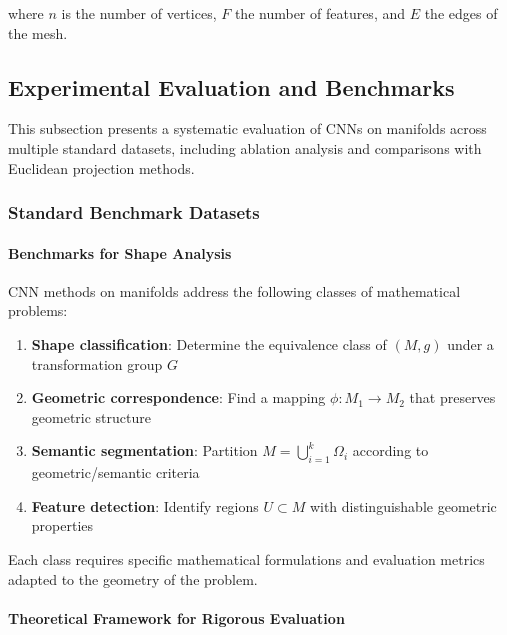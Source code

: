 where $n$ is the number of vertices, $F$ the number of features, and $E$ the edges of the mesh.

\subsection{Experimental Evaluation and Benchmarks}\label{subsec:evaluacion_experimental_variedades}

This subsection presents a systematic evaluation of CNNs on manifolds across multiple standard datasets, including ablation analysis and comparisons with Euclidean projection methods.

\subsubsection{Standard Benchmark Datasets}\label{subsubsec:datasets_benchmark}

\paragraph{Benchmarks for Shape Analysis}

\begin{definition}
CNN methods on manifolds address the following classes of mathematical problems:

\begin{enumerate}
    \item \textbf{Shape classification}: Determine the equivalence class of $(M, g)$ under a transformation group $G$
    \item \textbf{Geometric correspondence}: Find a mapping $\phi: M_1 \to M_2$ that preserves geometric structure
    \item \textbf{Semantic segmentation}: Partition $M = \bigcup_{i=1}^k \Omega_i$ according to geometric/semantic criteria
    \item \textbf{Feature detection}: Identify regions $U \subset M$ with distinguishable geometric properties
\end{enumerate}

Each class requires specific mathematical formulations and evaluation metrics adapted to the geometry of the problem.
\end{definition}

\paragraph{Theoretical Framework for Rigorous Evaluation}

